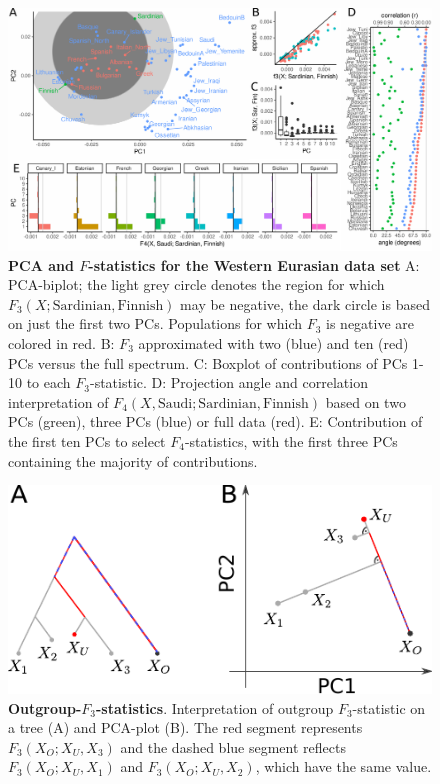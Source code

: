 \documentclass[12pt,fullpage, a4paper]{article}
\begin{document}
\begin{figure}[!ht]
	\includegraphics[width=\textwidth]{figures/fig_data_europe.pdf}
	\caption{\textbf{PCA and $F$-statistics for the Western Eurasian data set} A: PCA-biplot; the light grey circle denotes the region for which $F_3(X; \text{Sardinian}, \text{Finnish})$ may be negative, the dark circle is based on just the first two PCs. Populations for which $F_3$ is negative are colored in red. B: $F_3$ approximated with two (blue) and ten (red) PCs versus the full spectrum. C: Boxplot of contributions of PCs 1-10 to each $F_3$-statistic. D: Projection angle and correlation interpretation of $F_4(X, \text{Saudi}; \text{Sardinian}, \text{Finnish})$ based on two PCs (green), three PCs (blue) or full data (red). E: Contribution of the first ten PCs to select $F_4$-statistics, with the first three PCs containing the majority of contributions.}
	\label{fig:weu}
\end{figure}


\begin{figure}[!ht]
	\includegraphics[width=.6\textwidth]{figures/outgroup_f3.pdf}
	\caption{\textbf{Outgroup-$F_3$-statistics}. Interpretation of outgroup $F_3$-statistic on a tree (A) and PCA-plot (B).  The red segment represents $F_3(X_O; X_U, X_3)$ and the dashed blue segment reflects $F_3(X_O; X_U, X_1)$ and $F_3(X_O; X_U, X_2)$, which have the same value. 
	}
	\label{fig:outgroupf3}
\end{figure}
\end{document}
